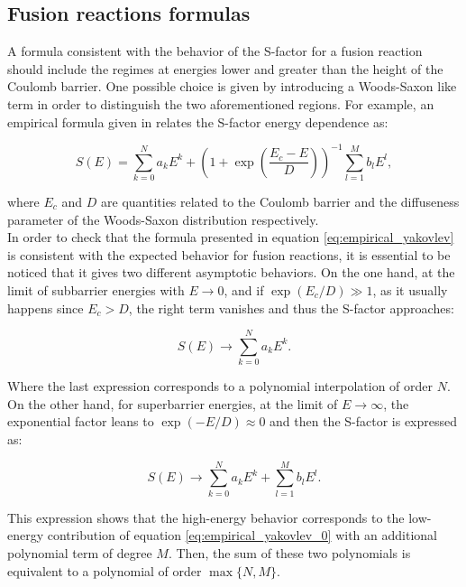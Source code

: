 \documentclass[openany]{book}
\begin{document}
\subsection{Fusion reactions formulas} \label{sub:empirical_fusion}

A formula consistent with the behavior of the S-factor for a  fusion reaction should include the regimes at energies lower and greater than the height of the Coulomb barrier. One possible choice is given by introducing a Woods-Saxon like term in order to distinguish the two aforementioned regions. For example, an empirical formula given in  \cite{beard_afanasjev_chamon_gasques_wiescher_yakovlev_2010} relates the S-factor energy dependence as:

\begin{equation} \label{eq:empirical_yakovlev}
	S(E) = \sum_{k=0}^{N} {a_kE^k} + \left(1 + \exp{\left( \frac{E_c - E}{D}\right)}\right)^{-1} \sum_{l=1}^{M} {b_lE^l},
\end{equation}

where $E_c$ and $D$ are quantities related to the Coulomb barrier and the diffuseness parameter of the Woods-Saxon distribution respectively. \\

In order to check that the formula presented in equation \ref{eq:empirical_yakovlev} is consistent with the expected behavior for fusion reactions, it is essential to be noticed that it gives two different asymptotic behaviors. On the one hand, at the limit of subbarrier energies with $E \rightarrow 0 $, and if $\exp {(E_c/D)} \gg 1$, as it usually happens since $E_c > D$, the right term vanishes and thus the S-factor approaches: 

\begin{equation} \label{eq:empirical_yakovlev_0}
	S(E) \rightarrow \sum_{k=0}^{N} {a_kE^k}. 
\end{equation}

Where the last expression corresponds to a polynomial interpolation of order $N$. On the other hand, for superbarrier energies, at the limit of $E \rightarrow \infty $, the exponential factor leans to $\exp {(-E/D)} \approx 0$ and then the S-factor is expressed as: 

\begin{equation} \label{eq:empirical_yakovlev_infty}
	S(E) \rightarrow \sum_{k=0}^{N} {a_kE^k} + \sum_{l=1}^{M} {b_lE^l}.
\end{equation}

This expression shows that the high-energy behavior corresponds to the low-energy contribution of equation \ref{eq:empirical_yakovlev_0} with an additional polynomial term of degree $M$. Then, the sum of these two polynomials is equivalent to a polynomial of order $\max \{{N, M}\}$. \\
\end{document}

